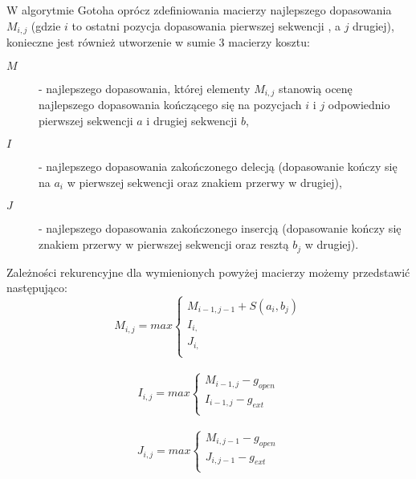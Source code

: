 \documentclass[a4paper,10pt]{article}
\begin{document}
	W algorytmie Gotoha oprócz zdefiniowania macierzy najlepszego dopasowania $M_{i,j}$ (gdzie $i$ to ostatni pozycja dopasowania pierwszej sekwencji , a $j$ drugiej), konieczne jest również utworzenie w sumie 3 macierzy kosztu:
	\begin{description}
	\item[$M$]
	 - najlepszego dopasowania, której elementy $M_{i,j}$ stanowią ocenę najlepszego dopasowania kończącego się na pozycjach $i$ i $j$ odpowiednio pierwszej sekwencji $a$ i drugiej sekwencji $b$,
	\item[$I$]
	 - najlepszego dopasowania zakończonego delecją (dopasowanie kończy się na $a_i$ w pierwszej sekwencji oraz znakiem przerwy w drugiej),
	\item[$J$]
	 - najlepszego dopasowania zakończonego insercją (dopasowanie kończy się znakiem przerwy w pierwszej sekwencji oraz resztą $b_j$ w drugiej).
	\end{description}
	Zależności rekurencyjne dla wymienionych powyżej macierzy możemy przedstawić następująco:
	\[
		M_{i,j} = max \left\{
			\begin{array}{ll}
				M_{i-1, j-1} + S(a_i, b_j)\\
				I_{i, }\\
				J_{i, }\\
			\end{array} \right.
	\]\\
	\[
		I_{i,j} = max \left\{
			\begin{array}{ll}
				M_{i-1, j} - g_{open}\\
				I_{i-1, j} - g_{ext}\\
			\end{array} \right.
	\]\\
	\[
		J_{i,j} = max \left\{
			\begin{array}{ll}
				M_{i, j-1} - g_{open}\\
				J_{i, j-1} - g_{ext}\\
			\end{array} \right.
	\]
\end{document}
